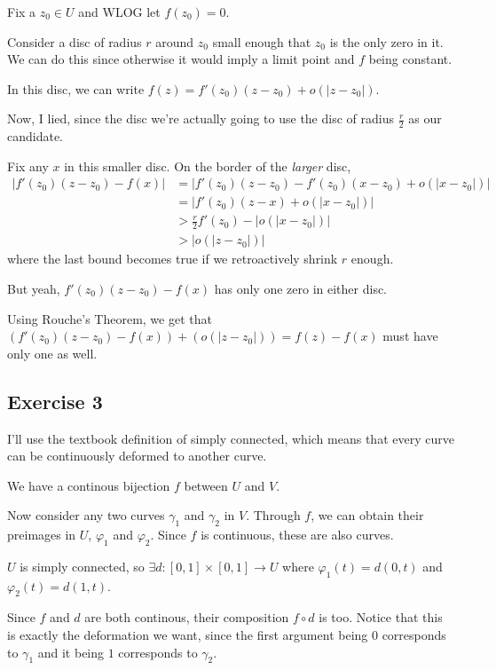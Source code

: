 \documentclass[12pt]{article}
\begin{document}
Fix a $z_0 \in U$ and WLOG let $f(z_0)=0$.

Consider a disc of radius $r$ around $z_0$ small enough that $z_0$ is the only zero in it.
We can do this since otherwise it would imply a limit point and $f$ being constant.

In this disc, we can write $f(z)=f'(z_0)(z-z_0)+o(|z-z_0|)$.

Now, I lied, since the disc we're actually going to use the disc of radius $\frac{r}{2}$ as our candidate.

Fix any $x$ in this smaller disc.
On the border of the \textit{larger} disc,
\begin{align*}
  |f'(z_0)(z-z_0)-f(x)|
  &= |f'(z_0)(z-z_0)-f'(z_0)(x-z_0)+o(|x-z_0|)| \\
  &= |f'(z_0)(z-x)+o(|x-z_0|)| \\
  &> \frac{r}{2}f'(z_0) - |o(|x-z_0|)| \\
  &> |o(|z-z_0|)|
\end{align*}
where the last bound becomes true if we retroactively shrink $r$ enough.

But yeah, $f'(z_0)(z-z_0)-f(x)$ has only one zero in either disc.

Using Rouche's Theorem, we get that $(f'(z_0)(z-z_0)-f(x))+(o(|z-z_0|))=f(z)-f(x)$ must have only one as well.

\pagebreak

\subsection{Exercise 3}

I'll use the textbook definition of simply connected, which means
that every curve can be continuously deformed to another curve.

We have a continous bijection $f$ between $U$ and $V$.

Now consider any two curves $\gamma_1$ and $\gamma_2$ in $V$.
Through $f$, we can obtain their preimages in $U$, $\varphi_1$ and $\varphi_2$.
Since $f$ is continuous, these are also curves.

$U$ is simply connected, so $\exists d: [0, 1] \times [0, 1] \to U$
where $\varphi_1(t)=d(0, t)$ and $\varphi_2(t)=d(1, t)$.

Since $f$ and $d$ are both continous, their composition $f \circ d$ is too.
Notice that this is exactly the deformation we want, since the first argument
being $0$ corresponds to $\gamma_1$ and it being $1$ corresponds to $\gamma_2$.
\end{document}
